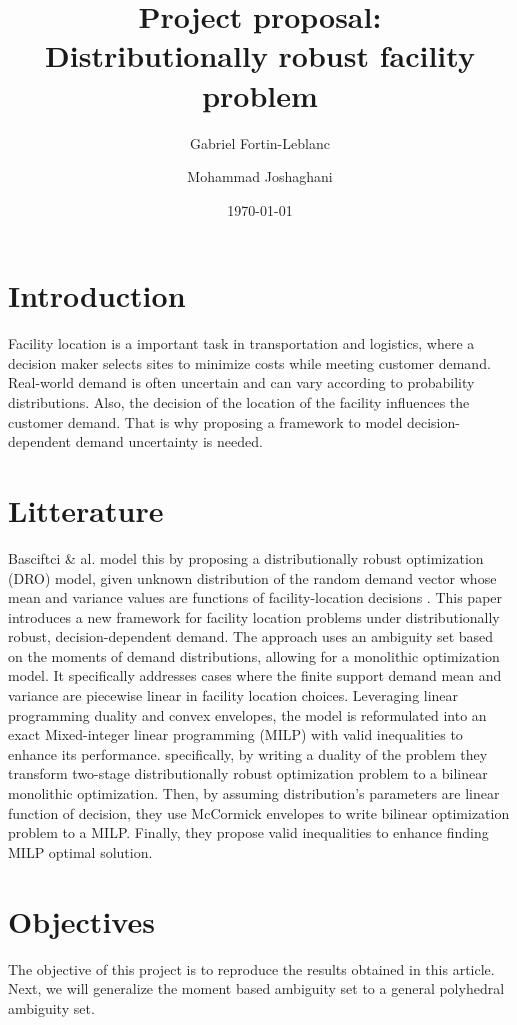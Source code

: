 \documentclass[letterpaper, 12pt]{article}
\title{
	Project proposal: \\
	Distributionally robust facility problem
}
\author[1]{Gabriel Fortin-Leblanc}
\author[2]{Mohammad Joshaghani}
\affil[1]{Université de Montréal}
\affil[2]{Université du Québec à Montréal}
\date{\today}
\begin{document}
	\maketitle
	\section*{Introduction}
	Facility location is a important task in transportation and logistics, where a decision maker selects sites to minimize costs while meeting customer demand. Real-world demand is often uncertain and can vary according to probability distributions. Also, the decision of the location of the facility influences the customer demand. That is why proposing a framework to model decision-dependent demand uncertainty is needed.  
	

	\section*{Litterature}
	Basciftci \& al. model this by proposing a distributionally robust optimization (DRO) model, given unknown distribution of the random demand vector whose mean
	and variance values are functions of facility-location decisions \cite{basciftci2021distributionally}.
	This paper introduces a new framework for facility location problems under distributionally robust, decision-dependent demand. The approach uses an ambiguity set based on the moments of demand distributions, allowing for a monolithic optimization model. It specifically addresses cases where the finite support demand mean and variance are piecewise linear in facility location choices. Leveraging linear programming duality and convex envelopes, the model is reformulated into an exact Mixed-integer linear programming (MILP) with valid inequalities to enhance its performance. specifically, by writing a duality of the problem they transform two-stage distributionally robust optimization problem to a bilinear monolithic optimization. Then, by assuming distribution's parameters are linear function of decision, they use McCormick envelopes to write bilinear optimization problem to a MILP. Finally, they propose valid inequalities to enhance finding MILP optimal solution.


	\section*{Objectives}
	
	The objective of this project is to reproduce the results obtained in this article. Next, we will generalize the moment based ambiguity set to a general polyhedral ambiguity set. 

	
	
\end{document}
